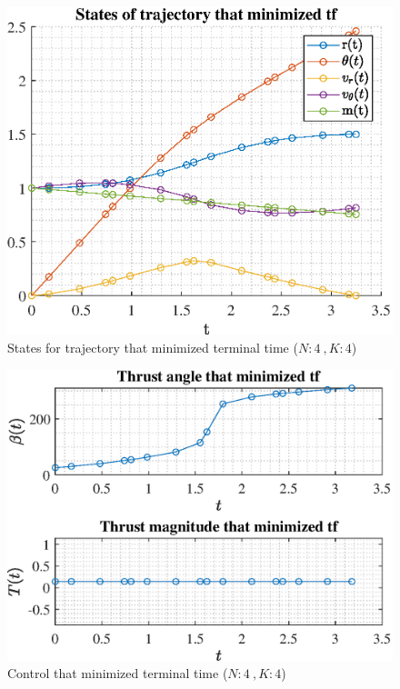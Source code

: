 \documentclass[]{article}
\begin{document}
	\begin{figure}
		\centering
		\includegraphics[scale=0.75]{states_N4_K4_C3_tf.eps}
		\caption{States for trajectory that minimized terminal time (\(N:4\ , K:4\))}
		\label{fig:states_N4_K4_C3_tf}
	\end{figure}
	\begin{figure}
		\centering
		\includegraphics[scale=0.75]{control_N4_K4_C3_tf.eps}
		\caption{Control that minimized terminal time (\(N:4\ , K:4\))}
		\label{fig:control_N4_K4_C3_tf}
	\end{figure}
\end{document}
